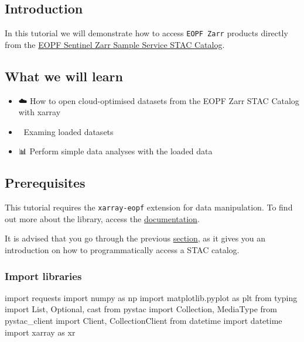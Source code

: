 \documentclass[
  letterpaper,
  DIV=11,
  numbers=noendperiod]{scrreprt}
\newenvironment{Shaded}{\begin{snugshade}}{\end{snugshade}}
\newcommand{\ImportTok}[1]{\textcolor[rgb]{0.00,0.46,0.62}{#1}}
\newcommand{\NormalTok}[1]{\textcolor[rgb]{0.00,0.23,0.31}{#1}}
\providecommand{\tightlist}{%
  \setlength{\itemsep}{0pt}\setlength{\parskip}{0pt}}
\begin{document}
\subsection{Introduction}\label{introduction-8}

In this tutorial we will demonstrate how to access \texttt{EOPF\ Zarr}
products directly from the
\href{https://stac.browser.user.eopf.eodc.eu/?.language=en}{EOPF
Sentinel Zarr Sample Service STAC Catalog}.

\subsection{What we will learn}\label{what-we-will-learn-7}

\begin{itemize}
\tightlist
\item
  ☁️ How to open cloud-optimised datasets from the EOPF Zarr STAC
  Catalog with xarray
\item
  🔎 Examing loaded datasets
\item
  📊 Perform simple data analyses with the loaded data
\end{itemize}

\subsection{Prerequisites}\label{prerequisites-2}

This tutorial requires the \texttt{xarray-eopf} extension for data
manipulation. To find out more about the library, access the
\href{https://eopf-sample-service.github.io/xarray-eopf/}{documentation}.

It is advised that you go through the previous
\hyperref[access-the-eopf-zarr-stac-api-with-python]{section}, as it
gives you an introduction on how to programmatically access a STAC
catalog.

\subsubsection{Import libraries}\label{import-libraries-2}

\begin{Shaded}
\begin{Highlighting}[]
\ImportTok{import}\NormalTok{ requests}
\ImportTok{import}\NormalTok{ numpy }\ImportTok{as}\NormalTok{ np}
\ImportTok{import}\NormalTok{ matplotlib.pyplot }\ImportTok{as}\NormalTok{ plt}
\ImportTok{from}\NormalTok{ typing }\ImportTok{import}\NormalTok{ List, Optional, cast}
\ImportTok{from}\NormalTok{ pystac }\ImportTok{import}\NormalTok{ Collection, MediaType}
\ImportTok{from}\NormalTok{ pystac\_client }\ImportTok{import}\NormalTok{ Client, CollectionClient}
\ImportTok{from}\NormalTok{ datetime }\ImportTok{import}\NormalTok{ datetime}
\ImportTok{import}\NormalTok{ xarray }\ImportTok{as}\NormalTok{ xr}
\end{Highlighting}
\end{Shaded}
\end{document}
